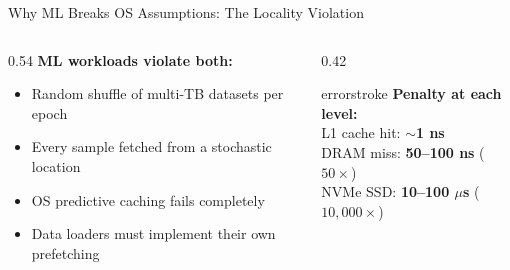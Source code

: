 \documentclass[aspectratio=169, 12pt]{beamer}
\begin{document}
\begin{frame}{Why ML Breaks OS Assumptions: The Locality Violation}
\begin{columns}[T]
\begin{column}{0.54\textwidth}
    \vspace{0.2cm}
    \textbf{ML workloads violate both:}
    \begin{itemize}\setlength\itemsep{1pt}
      \item Random shuffle of multi-TB datasets per epoch
      \item Every sample fetched from a stochastic location
      \item OS predictive caching fails completely
      \item Data loaders must implement their own prefetching
    \end{itemize}
  \end{column}
  \begin{column}{0.42\textwidth}
    \begin{mlsyscard}{errorstroke}
    \textbf{Penalty at each level:}\\[0.05cm]
    {\scriptsize
    L1 cache hit: \textbf{$\sim$1 ns}\\
    DRAM miss: \textbf{50--100 ns} ($50\times$)\\
    NVMe SSD: \textbf{10--100 $\mu$s} ($10{,}000\times$)}
    \end{mlsyscard}

    \vspace{0.1cm}
  \end{column}
\end{columns}

\end{frame}
\end{document}
